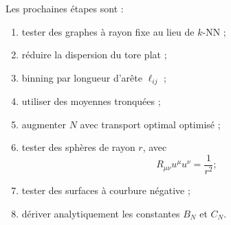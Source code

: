 \documentclass[11pt,a4paper]{article}
\begin{document}
Les prochaines étapes sont :

\begin{enumerate}
    \item tester des graphes à rayon fixe au lieu de \(k\)-NN ;
    \item réduire la dispersion du tore plat ;
    \item binning par longueur d'arête \(\ell_{ij}\) ;
    \item utiliser des moyennes tronquées ;
    \item augmenter \(N\) avec transport optimal optimisé ;
    \item tester des sphères de rayon \(r\), avec
    \[
    R_{\mu\nu}u^\mu u^\nu=\frac{1}{r^2};
    \]
    \item tester des surfaces à courbure négative ;
    \item dériver analytiquement les constantes \(B_N\) et \(C_N\).
\end{enumerate}
\end{document}

